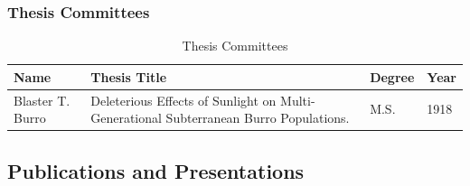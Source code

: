 \documentclass[letterpaper,12pt,times]{article}
\newcommand{\thead}[1]{\textbf{#1}}
\newif\ifinstr
\newcommand{\instr}[1]{
  \ifinstr
    \begin{leftbar}%
      \begin{color}{ColoradoRed}%
        \itshape
        \noindent%
        \ignorespaces%
        #1
      \end{color}
    \end{leftbar}%
  \else
  \fi
}
\begin{document}
\subsubsection*{Thesis Committees}

\begin{table}[H]
  \caption{Thesis Committees}
\begin{tabular}{|lp{3in}ll|}
  \hline
  \thead{Name} & \thead{Thesis Title} & \thead{Degree} & \thead{Year}\\
  \hline
  \hline
  Blaster T. Burro & Deleterious Effects of Sunlight on Multi-Generational
                     Subterranean Burro Populations.
                                      & M.S. & 1918 \\
  \hline
\end{tabular}
\end{table}

\subsection{Publications and Presentations}

\instr{
The following items should be included in this section:

\begin{itemize}
\item Books
\item Refereed Journals
\item Published in conference proceedings
\item Published scientific discussions
\item Published abstracts
\item Book reviews
\item Reports
\item Presentations
\item Other
\end{itemize}

 These should conform to the following format requirements

 \begin{itemize}
 \item Provide separate lists of archival journal publications,
   book/book chapters, and conference proceedings. Clearly identify
   publications that are peer reviewed and those that are not.

 \item Clearly mark all co-authors who are CSM students and CSM
   post-doctorals. In the example below, CSM students by *:\\
   J. R. Smith, A. Gables, P.T. Barnum*, ``Interesting Research
   Advances'', J. Important Research, 1, 40-48 (2013). DOI or
   identifying link
 \item If available, as part of the reference, also provide a
   hyperlink to an electronic version of the publication.
 \end{itemize}


 For Teaching and Library faculty for whom the section is not
 relevant, include on this page the following sentence; ``Not relevant
 for promotion consideration of faculty member.''
}
\end{document}
